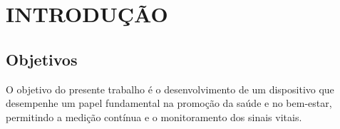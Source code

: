 \pagestyle{myheadings}
\setcounter{page}{16} %

\justifying

\section{INTRODUÇÃO}


\subsection{Objetivos}

O objetivo do presente trabalho é o desenvolvimento de um dispositivo que desempenhe um papel fundamental na promoção da saúde e no bem-estar, permitindo a medição contínua e o monitoramento dos sinais vitais.

